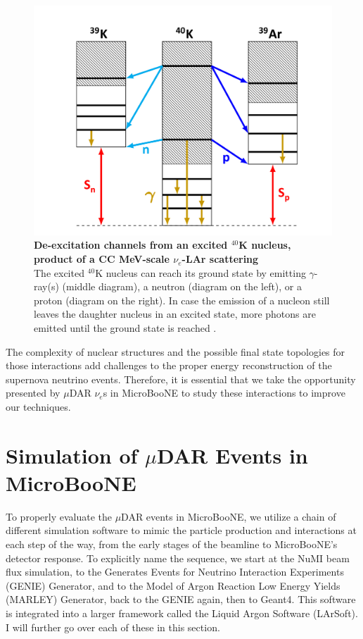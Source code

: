 \begin{figure}[h!]
    \centering
    \includegraphics[width=135mm]{Figures/40K_deexcitation.jpeg}
    \caption[De-excitation channels from an excited $^{40}$K nucleus, product of a CC MeV-scale $\nu_e$-LAr scattering]{{\textbf{De-excitation channels from an excited $^{40}$K nucleus, product of a CC MeV-scale $\nu_e$-LAr scattering}}\\  The excited $^{40}$K nucleus can reach its ground state by emitting $\gamma$-ray(s) (middle diagram), a neutron (diagram on the left), or a proton (diagram on the right). In case the emission of a nucleon still leaves the daughter nucleus in an excited state, more photons are emitted until the ground state is reached \cite{Gardiner_thesis}.}
    \label{40K_deexcite}
\end{figure}

The complexity of nuclear structures and the possible final state topologies for those interactions add challenges to the proper energy reconstruction of the supernova neutrino events. Therefore, it is essential that we take the opportunity presented by $\mu$DAR $\nu_e$s in MicroBooNE to study these interactions to improve our techniques. 


\section{Simulation of $\mu$DAR Events in MicroBooNE}

To properly evaluate the $\mu$DAR events in MicroBooNE, we utilize a chain of different simulation software to mimic the particle production and interactions at each step of the way, from the early stages of the beamline to MicroBooNE's detector response. 
To explicitly name the sequence, we start at the NuMI beam flux simulation, to the Generates Events for Neutrino Interaction Experiments (GENIE) Generator, and to the Model of Argon Reaction Low Energy Yields (MARLEY) Generator, back to the GENIE again, then to Geant4. This software is integrated into a larger framework called the Liquid Argon Software (LArSoft). I will further go over each of these in this section. 

